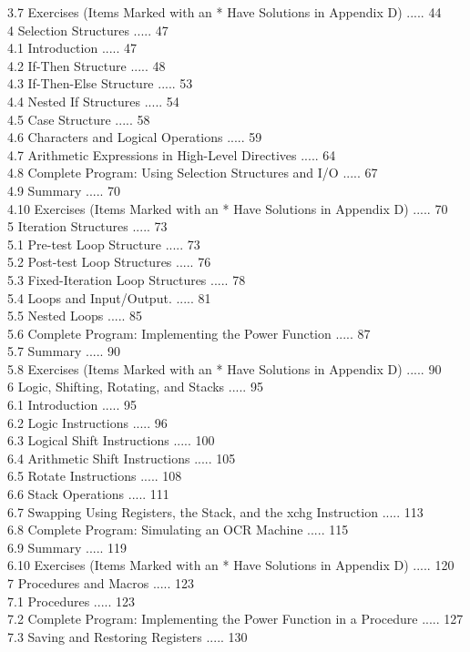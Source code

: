 \documentclass[10pt]{book}
\begin{document}
3.7 Exercises (Items Marked with an * Have Solutions in Appendix D) ..... 44\\
4 Selection Structures ..... 47\\
4.1 Introduction ..... 47\\
4.2 If-Then Structure ..... 48\\
4.3 If-Then-Else Structure ..... 53\\
4.4 Nested If Structures ..... 54\\
4.5 Case Structure ..... 58\\
4.6 Characters and Logical Operations ..... 59\\
4.7 Arithmetic Expressions in High-Level Directives ..... 64\\
4.8 Complete Program: Using Selection Structures and I/O ..... 67\\
4.9 Summary ..... 70\\
4.10 Exercises (Items Marked with an * Have Solutions in Appendix D) ..... 70\\
5 Iteration Structures ..... 73\\
5.1 Pre-test Loop Structure ..... 73\\
5.2 Post-test Loop Structures ..... 76\\
5.3 Fixed-Iteration Loop Structures ..... 78\\
5.4 Loops and Input/Output. ..... 81\\
5.5 Nested Loops ..... 85\\
5.6 Complete Program: Implementing the Power Function ..... 87\\
5.7 Summary ..... 90\\
5.8 Exercises (Items Marked with an * Have Solutions in Appendix D) ..... 90\\
6 Logic, Shifting, Rotating, and Stacks ..... 95\\
6.1 Introduction ..... 95\\
6.2 Logic Instructions ..... 96\\
6.3 Logical Shift Instructions ..... 100\\
6.4 Arithmetic Shift Instructions ..... 105\\
6.5 Rotate Instructions ..... 108\\
6.6 Stack Operations ..... 111\\
6.7 Swapping Using Registers, the Stack, and the xchg Instruction ..... 113\\
6.8 Complete Program: Simulating an OCR Machine ..... 115\\
6.9 Summary ..... 119\\
6.10 Exercises (Items Marked with an * Have Solutions in Appendix D) ..... 120\\
7 Procedures and Macros ..... 123\\
7.1 Procedures ..... 123\\
7.2 Complete Program: Implementing the Power Function in a Procedure ..... 127\\
7.3 Saving and Restoring Registers ..... 130\\
\end{document}
